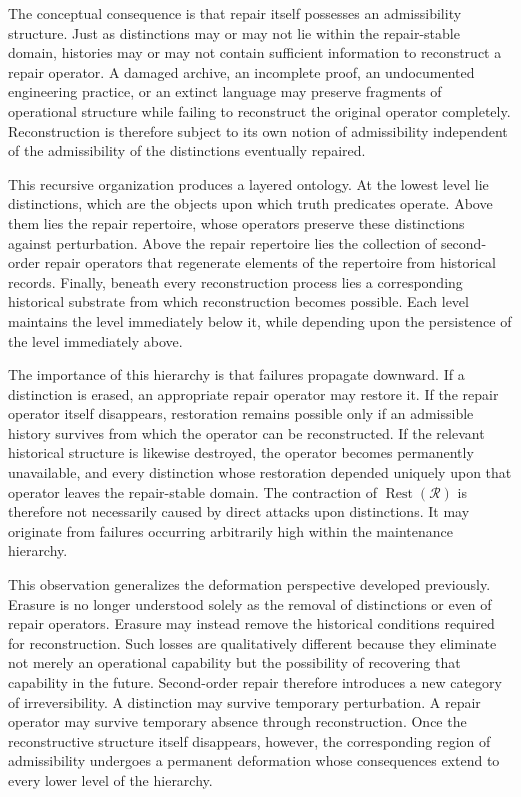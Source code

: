 \documentclass[12pt,oneside]{article}
\theoremstyle{plain}
\theoremstyle{definition}
\theoremstyle{remark}
\theoremstyle{plain}
\DeclareMathOperator{\Rest}{Rest}
\begin{document}
The conceptual consequence is that repair itself possesses an admissibility structure. Just as
distinctions may or may not lie within the repair-stable domain, histories may or may not contain
sufficient information to reconstruct a repair operator. A damaged archive, an incomplete proof, an
undocumented engineering practice, or an extinct language may preserve fragments of operational
structure while failing to reconstruct the original operator completely. Reconstruction is therefore
subject to its own notion of admissibility independent of the admissibility of the distinctions
eventually repaired.

This recursive organization produces a layered ontology. At the lowest level lie distinctions,
which are the objects upon which truth predicates operate. Above them lies the repair repertoire,
whose operators preserve these distinctions against perturbation. Above the repair repertoire lies
the collection of second-order repair operators that regenerate elements of the repertoire from
historical records. Finally, beneath every reconstruction process lies a corresponding historical
substrate from which reconstruction becomes possible. Each level maintains the level immediately
below it, while depending upon the persistence of the level immediately above.

The importance of this hierarchy is that failures propagate downward. If a distinction is erased,
an appropriate repair operator may restore it. If the repair operator itself disappears, restoration
remains possible only if an admissible history survives from which the operator can be
reconstructed. If the relevant historical structure is likewise destroyed, the operator becomes
permanently unavailable, and every distinction whose restoration depended uniquely upon that
operator leaves the repair-stable domain. The contraction of $\Rest(\mathcal{R})$ is therefore not
necessarily caused by direct attacks upon distinctions. It may originate from failures occurring
arbitrarily high within the maintenance hierarchy.

This observation generalizes the deformation perspective developed previously. Erasure is no longer
understood solely as the removal of distinctions or even of repair operators. Erasure may instead
remove the historical conditions required for reconstruction. Such losses are qualitatively
different because they eliminate not merely an operational capability but the possibility of
recovering that capability in the future. Second-order repair therefore introduces a new category
of irreversibility. A distinction may survive temporary perturbation. A repair operator may survive
temporary absence through reconstruction. Once the reconstructive structure itself disappears,
however, the corresponding region of admissibility undergoes a permanent deformation whose
consequences extend to every lower level of the hierarchy.
\end{document}

